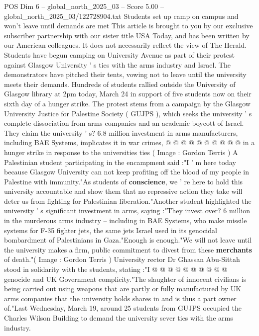 \begin{textsample}{POS Dim 6 – global\_north\_2025\_03 – Score 5.00 – global\_north\_2025\_03/122728904.txt}  \label{ex:f6_pos_276}
Students set up camp on campus and won't leave until demands are met This article is brought to you by our exclusive subscriber partnership with our sister title USA Today, and has been written by our American colleagues.
It does not necessarily reflect the view of The Herald.
Students have begun camping on University Avenue as part of their protest against Glasgow University ' s ties with the arms industry and Israel.
The demonstrators have pitched their tents, vowing not to leave until the university meets their demands.
Hundreds of students rallied outside the University of Glasgow library at 2pm today, March 24 in support of five students now on their sixth day of a hunger strike.
The protest stems from a campaign by the Glasgow University Justice for Palestine Society ( GUJPS ), which seeks the university ' s complete dissociation from arms companies and an academic boycott of Israel.
They claim the university ' s? 6.8 million investment in arms manufacturers, including BAE Systems, implicates it in war crimes, @ @ @ @ @ @ @ @ @ @ in a hunger strike in response to the universities ties ( Image : Gordon Terris ) A Palestinian student participating in the encampment said :"I ' m here today because Glasgow University can not keep profiting off the blood of my people in Palestine with immunity."As students of \textbf{conscience}, we ' re here to hold this university accountable and show them that no repressive action they take will deter us from fighting for Palestinian liberation."Another student highlighted the university ' s significant investment in arms, saying :"They invest over? 6 million in the murderous arms industry -- including in BAE Systems, who make missile systems for F-35 fighter jets, the same jets Israel used in its genocidal bombardment of Palestinians in Gaza."Enough is enough."We will not leave until the university makes a firm, public commitment to divest from these \textbf{merchants} of death."( Image : Gordon Terris ) University rector Dr Ghassan Abu-Sittah stood in solidarity with the students, stating :"I @ @ @ @ @ @ @ @ @ @ genocide and UK Government complicity."The slaughter of innocent civilians is being carried out using weapons that are partly or fully manufactured by UK arms companies that the university holds shares in and is thus a part owner of."Last Wednesday, March 19, around 25 students from GUJPS occupied the Charles Wilson Building to demand the university sever ties with the arms industry.

\end{textsample}
